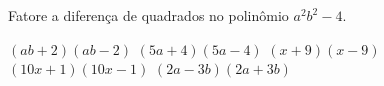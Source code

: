 Fatore a diferença de quadrados no polinômio $a^2b^2-4$.

$(ab+2)(ab-2)$
$(5a+4)(5a-4)$
$(x+9)(x-9)$
$(10x+1)(10x-1)$
$(2a-3b)(2a+3b)$


